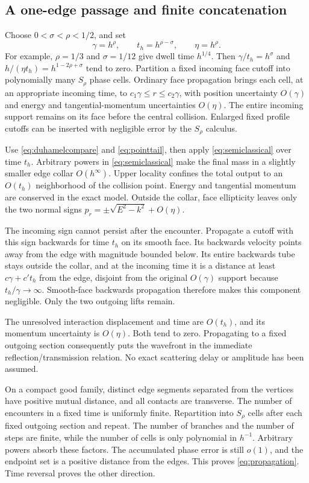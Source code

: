 \documentclass[11pt]{amsart}
\numberwithin{equation}{section}
\theoremstyle{remark}
\begin{document}
\subsection{A one-edge passage and finite concatenation}
Choose $0<\sigma<\rho<1/2$, and set
\begin{equation}\label{eq:scales}
\gamma=h^\rho,\qquad t_h=h^{\rho-\sigma},\qquad \eta=h^\rho .
\end{equation}
For example, $\rho=1/3$ and $\sigma=1/12$ give dwell time $h^{1/4}$. Then $\gamma/t_h=h^\sigma$ and $h/(\eta t_h)=h^{1-2\rho+\sigma}$ tend to zero. Partition a fixed incoming face cutoff into polynomially many $S_\rho$ phase cells. Ordinary face propagation brings each cell, at an appropriate incoming time, to $c_1\gamma\le r\le c_2\gamma$, with position uncertainty $O(\gamma)$ and energy and tangential-momentum uncertainties $O(\eta)$. The entire incoming support remains on its face before the central collision. Enlarged fixed profile cutoffs can be inserted with negligible error by the $S_\rho$ calculus.

Use \eqref{eq:duhamelcompare} and \eqref{eq:pointtail}, then apply \eqref{eq:semiclassical} over time $t_h$. Arbitrary powers in \eqref{eq:semiclassical} make the final mass in a slightly smaller edge collar $O(h^\infty)$. Upper locality confines the total output to an $O(t_h)$ neighborhood of the collision point. Energy and tangential momentum are conserved in the exact model. Outside the collar, face ellipticity leaves only the two normal signs $p_r=\pm\sqrt{E^2-k^2}+O(\eta)$.

The incoming sign cannot persist after the encounter. Propagate a cutoff with this sign backwards for time $t_h$ on its smooth face. Its backwards velocity points away from the edge with magnitude bounded below. Its entire backwards tube stays outside the collar, and at the incoming time it is a distance at least $c\gamma+c't_h$ from the edge, disjoint from the original $O(\gamma)$ support because $t_h/\gamma\to\infty$. Smooth-face backwards propagation therefore makes this component negligible. Only the two outgoing lifts remain.

The unresolved interaction displacement and time are $O(t_h)$, and its momentum uncertainty is $O(\eta)$. Both tend to zero. Propagating to a fixed outgoing section consequently puts the wavefront in the immediate reflection/transmission relation. No exact scattering delay or amplitude has been assumed.

On a compact good family, distinct edge segments separated from the vertices have positive mutual distance, and all contacts are transverse. The number of encounters in a fixed time is uniformly finite. Repartition into $S_\rho$ cells after each fixed outgoing section and repeat. The number of branches and the number of steps are finite, while the number of cells is only polynomial in $h^{-1}$. Arbitrary powers absorb these factors. The accumulated phase error is still $o(1)$, and the endpoint set is a positive distance from the edges. This proves \eqref{eq:propagation}. Time reversal proves the other direction.
\end{document}
